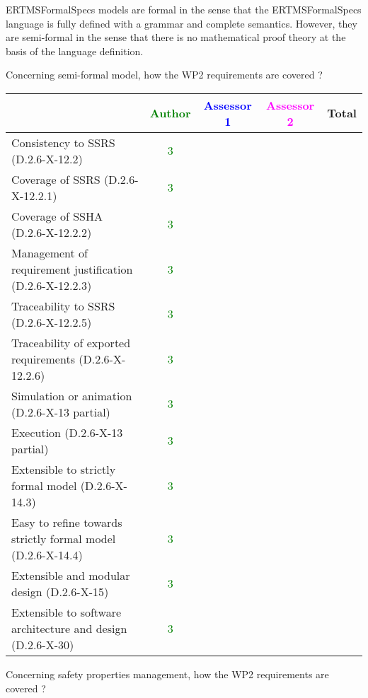 \begin{author_comment}
ERTMSFormalSpecs models are formal in the sense that the ERTMSFormalSpecs language is fully defined with a grammar and complete semantics. However, they are semi-formal in the sense that there is no mathematical proof theory at the basis of the language definition.  
\end{author_comment}


Concerning semi-formal model, how the WP2 requirements are covered ?

\begin{tabular}{|l | c | c | c | c|}
\hline
& \textcolor{green}{Author} & \textcolor{blue}{Assessor 1} & \textcolor{magenta}{Assessor 2} & Total \\
\hline 
Consistency to SSRS (D.2.6-X-12.2) & \textcolor{green}{3} & & &  \\
\hline
Coverage of SSRS (D.2.6-X-12.2.1)  & \textcolor{green}{3} & & &  \\
\hline
Coverage of SSHA (D.2.6-X-12.2.2)  & \textcolor{green}{3} & & &  \\
\hline
Management of requirement justification (D.2.6-X-12.2.3)  & \textcolor{green}{3} & & &  \\
\hline
Traceability to  SSRS (D.2.6-X-12.2.5)  & \textcolor{green}{3} & & &  \\
\hline
Traceability of exported requirements (D.2.6-X-12.2.6)  & \textcolor{green}{3} & & &  \\
\hline
Simulation or animation (D.2.6-X-13 partial)  & \textcolor{green}{3} & & &  \\
\hline
Execution (D.2.6-X-13 partial)  & \textcolor{green}{3} & & &  \\
\hline
Extensible to strictly formal model (D.2.6-X-14.3) & \textcolor{green}{3} & & &  \\
\hline
Easy to  refine towards strictly formal model (D.2.6-X-14.4) & \textcolor{green}{3} & & &  \\
\hline
Extensible and modular design (D.2.6-X-15)  & \textcolor{green}{3} & & &  \\
\hline
Extensible to software architecture and design (D.2.6-X-30)   & \textcolor{green}{3} & & &  \\
\hline
\end{tabular}

Concerning safety properties management, how the WP2 requirements are covered ?

